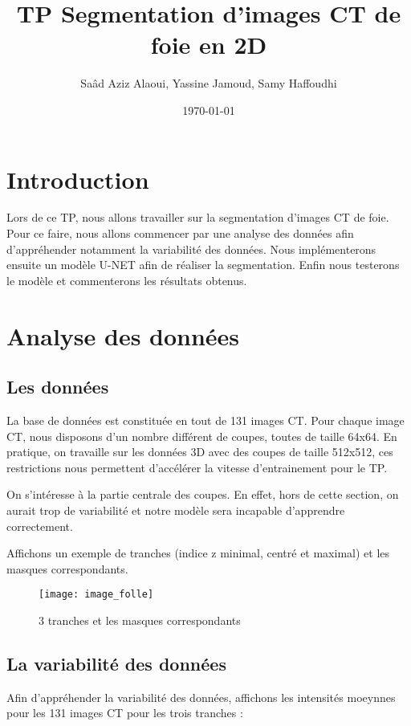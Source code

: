 \documentclass[12pt,a4paper,titlepage]{scrartcl}
\title{TP Segmentation d'images CT de foie en 2D}
\author{Saâd Aziz Alaoui, Yassine Jamoud, Samy Haffoudhi}
\date{\today}
\begin{document}
\maketitle

\section*{Introduction}

Lors de ce TP, nous allons travailler sur la segmentation d'images CT
de foie. Pour ce faire, nous allons commencer par une analyse des données
afin d'appréhender notamment la variabilité des données. Nous
implémenterons ensuite un modèle U-NET afin de réaliser la segmentation.
Enfin nous testerons le modèle et commenterons les résultats obtenus.

\section{Analyse des données}

\subsection{Les données}

La base de données est constituée en tout de 131 images CT.
Pour chaque image CT, nous disposons d'un nombre différent de coupes, toutes
de taille 64x64. En pratique, on travaille sur les données 3D avec des
coupes de taille 512x512, ces restrictions nous permettent d'accélérer
la vitesse d'entrainement pour le TP.

On s'intéresse à la partie centrale des coupes. En effet, hors de cette
section, on aurait trop de variabilité et notre modèle sera incapable
d'apprendre correctement.

Affichons un exemple de tranches (indice z minimal, centré et maximal) et
les masques correspondants.

\begin{figure}[H]
    \caption{3 tranches et les masques correspondants}
    \texttt{[image: image\_folle]}
    \centering
\end{figure}

\subsection{La variabilité des données}

Afin d'appréhender la variabilité des données, affichons les intensités
moeynnes pour les 131 images CT pour les trois tranches :
\end{document}
